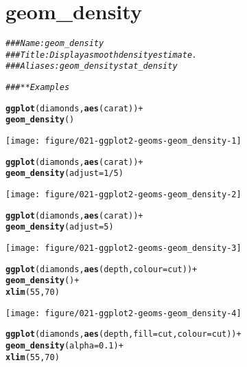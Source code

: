 \documentclass[a4paper,titlepage]{tufte-handout}\usepackage[]{graphicx}\usepackage[]{color}
\makeatletter
\def\maxwidth{ %
  \ifdim\Gin@nat@width>\linewidth
    \linewidth
  \else
    \Gin@nat@width
  \fi
}
\newcommand{\hlnum}[1]{\textcolor[rgb]{0.686,0.059,0.569}{#1}}%
\newcommand{\hlcom}[1]{\textcolor[rgb]{0.678,0.584,0.686}{\textit{#1}}}%
\newcommand{\hlopt}[1]{\textcolor[rgb]{0,0,0}{#1}}%
\newcommand{\hlstd}[1]{\textcolor[rgb]{0.345,0.345,0.345}{#1}}%
\newcommand{\hlkwc}[1]{\textcolor[rgb]{0.333,0.667,0.333}{#1}}%
\newcommand{\hlkwd}[1]{\textcolor[rgb]{0.737,0.353,0.396}{\textbf{#1}}}%
\newenvironment{kframe}{%
 \def\at@end@of@kframe{}%
 \ifinner\ifhmode%
  \def\at@end@of@kframe{\end{minipage}}%
  \begin{minipage}{\columnwidth}%
 \fi\fi%
 \def\FrameCommand##1{\hskip\@totalleftmargin \hskip-\fboxsep
 \colorbox{shadecolor}{##1}\hskip-\fboxsep
     \hskip-\linewidth \hskip-\@totalleftmargin \hskip\columnwidth}%
 \MakeFramed {\advance\hsize-\width
   \@totalleftmargin\z@ \linewidth\hsize
   \@setminipage}}%
 {\par\unskip\endMakeFramed%
 \at@end@of@kframe}
\newenvironment{knitrout}{}{} %
\makeatother
\begin{document}
\section{geom\_density}

\begin{knitrout}
\color{fgcolor}\begin{kframe}
\begin{alltt}
\hlcom{### Name: geom_density}
\hlcom{### Title: Display a smooth density estimate.}
\hlcom{### Aliases: geom_density stat_density}

\hlcom{### ** Examples}

\hlkwd{ggplot}\hlstd{(diamonds,} \hlkwd{aes}\hlstd{(carat))} \hlopt{+}
  \hlkwd{geom_density}\hlstd{()}
\end{alltt}
\end{kframe}
\texttt{[image: figure/021-ggplot2-geoms-geom\_density-1]} 
\begin{kframe}\begin{alltt}
\hlkwd{ggplot}\hlstd{(diamonds,} \hlkwd{aes}\hlstd{(carat))} \hlopt{+}
  \hlkwd{geom_density}\hlstd{(}\hlkwc{adjust} \hlstd{=} \hlnum{1}\hlopt{/}\hlnum{5}\hlstd{)}
\end{alltt}
\end{kframe}
\texttt{[image: figure/021-ggplot2-geoms-geom\_density-2]} 
\begin{kframe}\begin{alltt}
\hlkwd{ggplot}\hlstd{(diamonds,} \hlkwd{aes}\hlstd{(carat))} \hlopt{+}
  \hlkwd{geom_density}\hlstd{(}\hlkwc{adjust} \hlstd{=} \hlnum{5}\hlstd{)}
\end{alltt}
\end{kframe}
\texttt{[image: figure/021-ggplot2-geoms-geom\_density-3]} 
\begin{kframe}\begin{alltt}
\hlkwd{ggplot}\hlstd{(diamonds,} \hlkwd{aes}\hlstd{(depth,} \hlkwc{colour} \hlstd{= cut))} \hlopt{+}
  \hlkwd{geom_density}\hlstd{()} \hlopt{+}
  \hlkwd{xlim}\hlstd{(}\hlnum{55}\hlstd{,} \hlnum{70}\hlstd{)}
\end{alltt}


{\ttfamily\noindent\color{warningcolor}{\#\# Warning: Removed 45 rows containing non-finite values (stat\_density).}}\end{kframe}
\texttt{[image: figure/021-ggplot2-geoms-geom\_density-4]} 
\begin{kframe}\begin{alltt}
\hlkwd{ggplot}\hlstd{(diamonds,} \hlkwd{aes}\hlstd{(depth,} \hlkwc{fill} \hlstd{= cut,} \hlkwc{colour} \hlstd{= cut))} \hlopt{+}
  \hlkwd{geom_density}\hlstd{(}\hlkwc{alpha} \hlstd{=} \hlnum{0.1}\hlstd{)} \hlopt{+}
  \hlkwd{xlim}\hlstd{(}\hlnum{55}\hlstd{,} \hlnum{70}\hlstd{)}
\end{alltt}



\end{kframe}
\end{knitrout}
\end{document}
